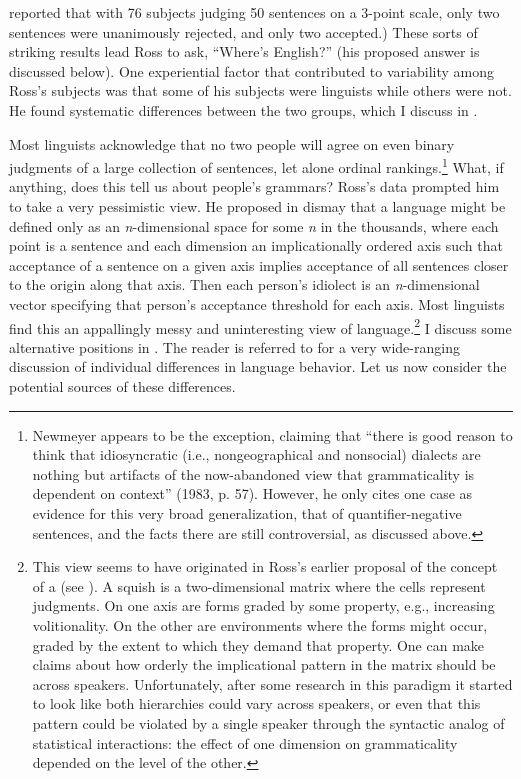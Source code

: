  reported that with 76 subjects judging  50 sentences on a 3-point scale, only two sentences were unanimously rejected, and only two accepted.) These sorts of striking results lead Ross to ask, ``Where's English?'' (his proposed answer is discussed below). One experiential factor that contributed to variability among Ross's subjects was that some of his subjects were linguists while others were not. He found systematic differences between the two groups, which I discuss in .

Most linguists acknowledge that no two people will agree on even binary judgments of a large collection of sentences, let alone ordinal rankings.\footnote{Newmeyer appears to be the exception, claiming that ``there is good reason to think that idiosyncratic (i.e., nongeographical and nonsocial) dialects are nothing but artifacts of the now-abandoned view that grammaticality is dependent on context'' (1983, p. 57). However, he only cites one case as evidence for this very broad generalization, that of quantifier-negative sentences, and the facts there are still controversial, as discussed above.}
 What, if anything, does this tell us about people's grammars? Ross's data prompted him to take a very pessimistic view. He proposed in dismay that a language might be defined only as an \textit{n}-dimensional space for some \textit{n} in the thousands, where each point is a sentence and each dimension an implicationally ordered axis such that acceptance of a sentence on a given axis implies acceptance of all sentences closer to the origin along that axis. Then each person's idiolect is an \textit{n}-dimensional vector specifying that person's acceptance threshold for each axis. Most linguists find this an appallingly messy and uninteresting view of language.\footnote{This view seems to have originated in Ross's earlier proposal of the concept of a  (see ). A squish is a two-dimensional matrix where the cells represent judgments. On one axis are forms graded by some property, e.g., increasing volitionality. On the other are environments where the forms might occur, graded by the extent to which they demand that property. One can make claims about how orderly the implicational pattern in the matrix should be across speakers. Unfortunately, after some research in this paradigm it started to look like both hierarchies could vary across speakers, or even that this pattern could be violated by a single speaker through the syntactic analog of statistical interactions: the effect of one dimension on grammaticality depended on the level of the other.
} 
I discuss some alternative positions in . The reader is referred to \citet{FillmoreEtAl1979a} for a very wide-ranging discussion of individual differences in language behavior. Let us now consider the potential sources of these differences.

